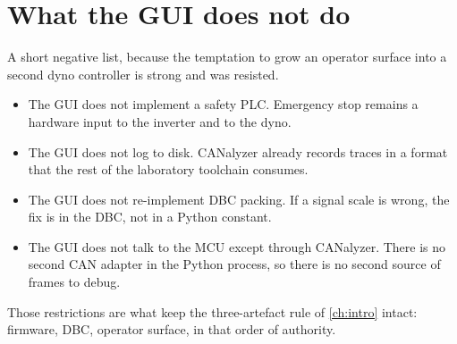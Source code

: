\section{What the GUI does not do}
A short negative list, because the temptation to grow an operator surface
into a second dyno controller is strong and was resisted.

\begin{itemize}[leftmargin=1.6em]
  \item The GUI does not implement a safety PLC. Emergency stop remains a
        hardware input to the inverter and to the dyno.
  \item The GUI does not log to disk. CANalyzer already records traces in
        a format that the rest of the laboratory toolchain consumes.
  \item The GUI does not re-implement DBC packing. If a signal scale is
        wrong, the fix is in the DBC, not in a Python constant.
  \item The GUI does not talk to the MCU except through CANalyzer. There
        is no second CAN adapter in the Python process, so there is no
        second source of frames to debug.
\end{itemize}

Those restrictions are what keep the three-artefact rule of
\cref{ch:intro} intact: firmware, DBC, operator surface, in that order of
authority.
